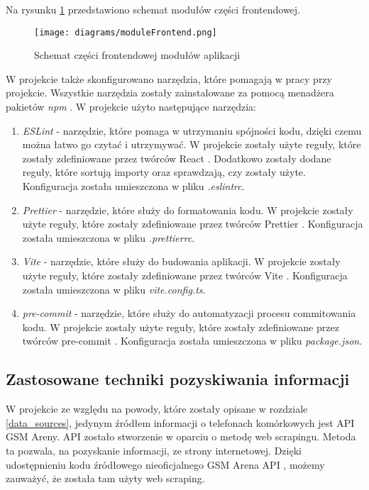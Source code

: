 Na rysunku \ref{module_frontend} przedstawiono schemat modułów części frontendowej.

\begin{figure}[H]
    \centering
    \texttt{[image: diagrams/moduleFrontend.png]}
    \caption{Schemat części frontendowej modułów aplikacji}
    \label{module_frontend}
\end{figure}

W projekcie także skonfigurowano narzędzia, które pomagają w pracy przy projekcie. Wszystkie narzędzia zostały zainstalowane za pomocą menadżera pakietów \textit{npm} \cite{npm}. W projekcie użyto następujące narzędzia:
\begin{enumerate}
    \item \textit{ESLint} \cite{ESLint} - narzędzie, które pomaga w utrzymaniu spójności kodu, dzięki czemu można łatwo go czytać i utrzymywać. W projekcie zostały użyte reguły, które zostały zdefiniowane przez twórców React \cite{React}. Dodatkowo zostały dodane reguły, które sortują importy oraz sprawdzają, czy zostały użyte. Konfiguracja została umieszczona w pliku \textit{.eslintrc}.
    \item \textit{Prettier} \cite{Prettier} - narzędzie, które służy do formatowania kodu. W projekcie zostały użyte reguły, które zostały zdefiniowane przez twórców Prettier \cite{Prettier}. Konfiguracja została umieszczona w pliku \textit{.prettierrc}.
    \item \textit{Vite} \cite{vite} - narzędzie, które służy do budowania aplikacji. W projekcie zostały użyte reguły, które zostały zdefiniowane przez twórców Vite \cite{vite}. Konfiguracja została umieszczona w pliku \textit{vite.config.ts}.
    \item \textit{pre-commit} \cite{pre_commit} - narzędzie, które służy do automatyzacji procesu commitowania kodu. W projekcie zostały użyte reguły, które zostały zdefiniowane przez twórców pre-commit \cite{pre_commit}. Konfiguracja została umieszczona w pliku \textit{package.json}.
\end{enumerate}

\subsection{Zastosowane techniki pozyskiwania informacji}
W projekcie ze względu na powody, które zostały opisane w rozdziale \ref{data_sources}, jedynym źródłem informacji o telefonach komórkowych jest API GSM Areny. API zostało stworzenie w oparciu o metodę web scrapingu. Metoda ta pozwala, na pozyskanie informacji, ze strony internetowej. Dzięki udostępnieniu kodu źródłowego nieoficjalnego \linebreak GSM Arena API \cite{gsm_arena_api}, możemy zauważyć, że została tam użyty web scraping.

